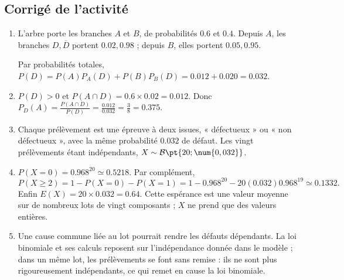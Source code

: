 \subsection{Corrigé de l'activité}\begin{enumerate}
\item L'arbre porte les branches $A$ et $B$, de probabilités $\num{0,6}$ et $\num{0,4}$. Depuis $A$, les branches $D,\overline D$ portent $\num{0,02},\num{0,98}$ ; depuis $B$, elles portent $\num{0,05},\num{0,95}$.
\begin{center}\end{center}
Par probabilités totales, $P(D)=P(A)P_A(D)+P(B)P_B(D)=\num{0,012}+\num{0,020}=\num{0,032}$.
\item $P(D)>0$ et $P(A\cap D)=\num{0,6}\times\num{0,02}=\num{0,012}$. Donc $P_D(A)=\frac{P(A\cap D)}{P(D)}=\frac{\num{0,012}}{\num{0,032}}=\frac{3}{8}=\num{0,375}$.
\item Chaque prélèvement est une épreuve à deux issues, « défectueux » ou « non défectueux », avec la même probabilité $\num{0,032}$ de défaut. Les vingt prélèvements étant indépendants, $X\sim\mathcal B\pt{20;\num{0,032}}$.
\item $P(X=0)=\num{0,968}^{20}\simeq\num{0,5218}$. Par complément,
\[P(X\ge2)=1-P(X=0)-P(X=1)=1-\num{0,968}^{20}-20(\num{0,032})\num{0,968}^{19}\simeq\num{0,1332}.\]
Enfin $E(X)=20\times\num{0,032}=\num{0,64}$. Cette espérance est une valeur moyenne sur de nombreux lots de vingt composants ; $X$ ne prend que des valeurs entières.
\item Une cause commune liée au lot pourrait rendre les défauts dépendants. La loi binomiale et ses calculs reposent sur l'indépendance donnée dans le modèle ; dans un même lot, les prélèvements se font sans remise : ils ne sont plus rigoureusement indépendants, ce qui remet en cause la loi binomiale.
\end{enumerate}

